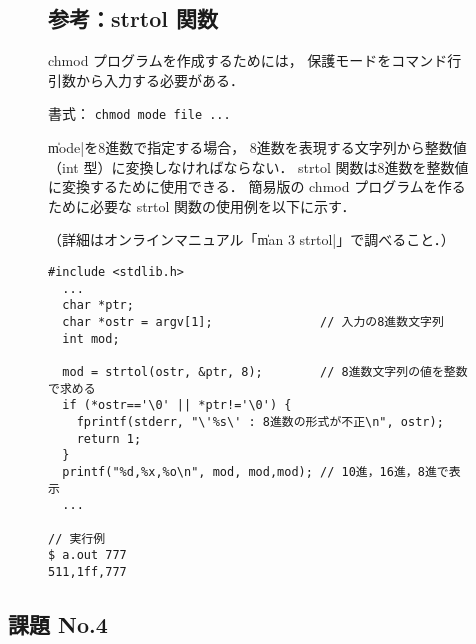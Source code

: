 \begin{figure}
\begin{framed}
\subsection*{参考：strtol 関数}
chmod プログラムを作成するためには，
保護モードをコマンド行引数から入力する必要がある．

\centerline{書式： \texttt{chmod mode file ...}}

\|mode|を8進数で指定する場合，
8進数を表現する文字列から整数値（int 型）に変換しなければならない．
strtol 関数は8進数を整数値に変換するために使用できる．
簡易版の chmod プログラムを作るために必要な
strtol 関数の使用例を以下に示す．

（詳細はオンラインマニュアル「\|man 3 strtol|」で調べること．）

\begin{lstlisting}[numbers=none, frame=none]
#include <stdlib.h>
  ...
  char *ptr;
  char *ostr = argv[1];               // 入力の8進数文字列
  int mod;

  mod = strtol(ostr, &ptr, 8);        // 8進数文字列の値を整数で求める
  if (*ostr=='\0' || *ptr!='\0') {
    fprintf(stderr, "\'%s\' : 8進数の形式が不正\n", ostr);
    return 1;
  }
  printf("%d,%x,%o\n", mod, mod,mod); // 10進，16進，8進で表示
  ...

// 実行例
$ a.out 777
511,1ff,777
\end{lstlisting}
\end{framed}
\end{figure}

\subsection*{課題 No.4}

